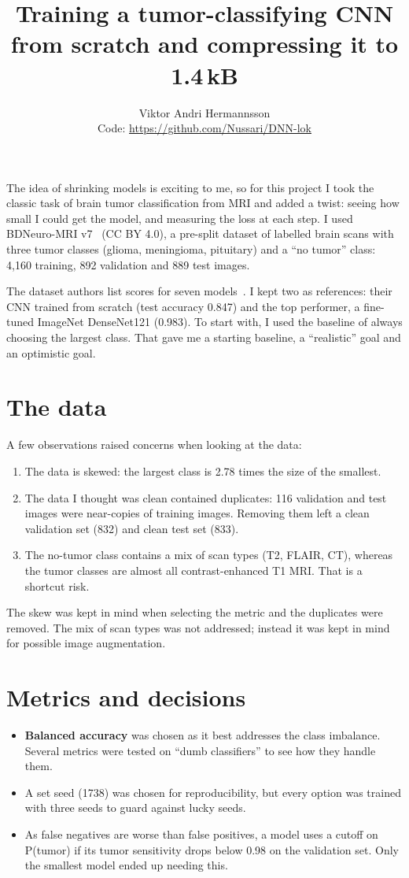 \documentclass[10pt,a4paper,twocolumn]{article}
\title{\vspace{-1.2cm}\Large Training a tumor-classifying CNN from scratch and compressing it to 1.4\,kB}
\author{Viktor Andri Hermannsson \\ \small Code: \url{https://github.com/Nussari/DNN-lok}}
\date{\vspace{-0.8cm}}
\begin{document}
\maketitle

The idea of shrinking models is exciting to me, so for this project I took the classic task of brain tumor
classification from MRI and added a twist: seeing how small I could get the model, and measuring the loss at
each step. I used BDNeuro-MRI v7~\cite{data} (CC BY 4.0), a pre-split dataset of labelled brain scans with three
tumor classes (glioma, meningioma, pituitary) and a ``no tumor'' class: 4,160 training, 892 validation and
889 test images.

The dataset authors list scores for seven models~\cite{bench}. I kept two as references: their CNN trained from
scratch (test accuracy 0.847) and the top performer, a fine-tuned ImageNet DenseNet121 (0.983). To start with, I
used the baseline of always choosing the largest class. That gave me a starting baseline, a ``realistic'' goal
and an optimistic goal.

\section{The data}
A few observations raised concerns when looking at the data:
\begin{enumerate}
  \item The data is skewed: the largest class is 2.78 times the size of the smallest.
  \item The data I thought was clean contained duplicates: 116 validation and test images were near-copies of
        training images. Removing them left a clean validation set (832) and clean test set (833).
  \item The no-tumor class contains a mix of scan types (T2, FLAIR, CT), whereas the tumor classes are almost
        all contrast-enhanced T1 MRI. That is a shortcut risk.
\end{enumerate}
The skew was kept in mind when selecting the metric and the duplicates were removed. The mix of scan types was not
addressed; instead it was kept in mind for possible image augmentation.

\section{Metrics and decisions}
\begin{itemize}
  \item \textbf{Balanced accuracy} was chosen as it best addresses the class imbalance. Several metrics were
        tested on ``dumb classifiers'' to see how they handle them.
  \item A set seed (1738) was chosen for reproducibility, but every option was trained with three seeds to
        guard against lucky seeds.
  \item As false negatives are worse than false positives, a model uses a cutoff on P(tumor) if its tumor
        sensitivity drops below 0.98 on the validation set. Only the smallest model ended up needing this.
\end{itemize}
\end{document}
